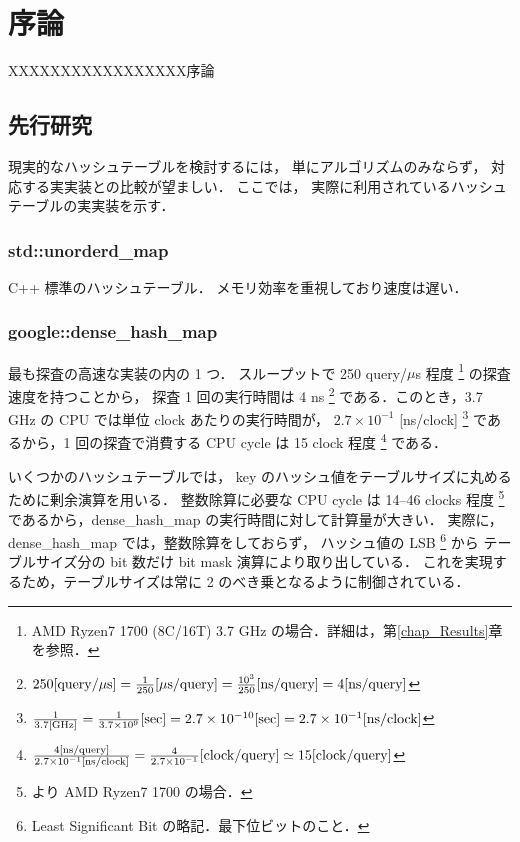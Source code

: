 \chapter{序論}
\label{chap_Introduction}

XXXXXXXXXXXXXXXXX序論

\section{先行研究}
現実的なハッシュテーブルを検討するには，
単にアルゴリズムのみならず，
対応する実実装との比較が望ましい．
ここでは，
実際に利用されているハッシュテーブルの実実装を示す．

\subsection{std::unorderd\_map}
C++ 標準のハッシュテーブル．
メモリ効率を重視しており速度は遅い．

\subsection{google::dense\_hash\_map}
最も探査の高速な実装の内の 1 つ．
スループットで 250 query/$\mu$s 程度
\footnote{AMD Ryzen7 1700 (8C/16T) 3.7 GHz の場合．詳細は，第\ref{chap_Results}章を参照．}
の探査速度を持つことから，
探査 1 回の実行時間は 4 ns
\footnote{
  $
    250{\rm [query \slash \mu s]}
    = \frac{1}{250} {\rm [\mu s \slash query]}
    = \frac{10^3}{250} {\rm [ns \slash query]}
    = 4 {\rm [ns \slash query]}
  $
}
である．このとき，3.7 GHz の CPU では単位 clock あたりの実行時間が，
$2.7 \times 10^{-1}$ [ns/clock]
\footnote{
  $
    \frac{1}{3.7 {\rm [GHz]}}
    = \frac{1}{3.7 \times 10^9}{\rm [sec]}
    = 2.7 \times 10^{-10}{\rm [sec]}
    = 2.7 \times 10^{-1}{\rm [ns/clock]}
  $
}
であるから，1 回の探査で消費する CPU cycle は
15 clock 程度
\footnote{
  $
    \frac{ 4 {\rm [ns/query]} }{ 2.7 \times 10^{-1} {\rm [ns/clock]} }
    = \frac{ 4 }{ 2.7 \times 10^{-1} } {\rm [clock/query]}
    \simeq 15 {\rm [clock/query]}
  $
}
である．

いくつかのハッシュテーブルでは，
key のハッシュ値をテーブルサイズに丸めるために剰余演算を用いる．
整数除算に必要な CPU cycle は 14--46 clocks 程度
\footnote{
  \cite{AgnerFog2018}より AMD Ryzen7 1700 の場合．
}
であるから，dense\_hash\_map の実行時間に対して計算量が大きい．
実際に，
dense\_hash\_map では，整数除算をしておらず，
ハッシュ値の LSB \footnote{Least Significant Bit の略記．最下位ビットのこと．} から
テーブルサイズ分の bit 数だけ bit mask 演算により取り出している．
これを実現するため，テーブルサイズは常に 2 のべき乗となるように制御されている．

